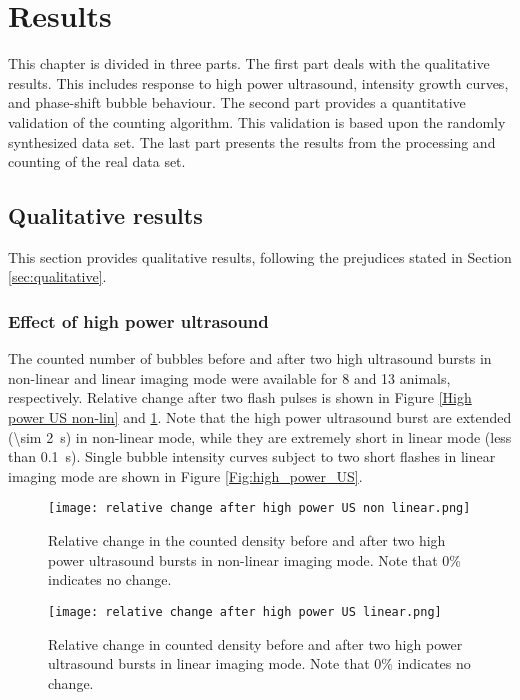 \section{Results}
This chapter is divided in three parts. The first part deals with the qualitative results. This includes response to high power ultrasound, intensity growth curves, and phase-shift bubble behaviour. The second part provides a quantitative validation of the counting algorithm. This validation is based upon the randomly synthesized data set. The last part presents the results from the processing and counting of the real data set. 
 
\subsection{Qualitative results}
This section provides qualitative results, following the prejudices stated in Section \ref{sec:qualitative}.
\subsubsection{Effect of high power ultrasound}

The counted number of bubbles before and after two high ultrasound bursts in non-linear and linear imaging mode were available for 8 and 13 animals, respectively. Relative change after two flash pulses is shown in Figure \ref{High power US non-lin} and \ref{High power US lin}. Note that the high power ultrasound burst are extended (\SI{\sim 2}{\second}) in non-linear mode, while they are extremely short in linear mode (less than \SI{0.1}{\second}). Single bubble intensity curves subject to two short flashes in linear imaging mode are shown in Figure \ref{Fig:high_power_US}. 
\begin{figure}
\centering
\begin{minipage}[t]{.45\textwidth}
\centering
\texttt{[image: relative change after high power US non linear.png]}
\caption{Relative change in the counted density before and after two high power ultrasound bursts in non-linear imaging mode. Note that 0\% indicates no change.}
\label{High power US non-lin}
\end{minipage}\hfill
\begin{minipage}[t]{.45\textwidth}
\centering
\texttt{[image: relative change after high power US linear.png]}
\caption{Relative change in counted density before and after two high power ultrasound bursts in linear imaging mode. Note that 0\% indicates no change.}
\label{High power US lin}
\end{minipage}
\end{figure}

